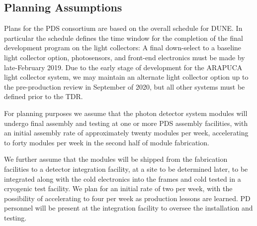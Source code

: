 \subsection{Planning Assumptions}
\label{sec:fdsp-pd-org-assmp}


Plans for the PDS consortium are based on the overall schedule for DUNE. In particular the  schedule defines the time window for the completion of the final development program on the light collectors: A final down-select to a baseline light collector option, photosensors, and front-end electronics must be made by late-February 2019.  Due to the early stage of development for the ARAPUCA light collector system, we may maintain an alternate light collector option up to the pre-production review in September of 2020, but all other systems must be defined prior to the TDR.

For planning purposes we assume that the photon detector system modules will undergo final assembly and testing at one or more PDS assembly facilities, with an initial  assembly rate of approximately twenty modules per week, accelerating to forty modules per week in the second half of module fabrication.

We further assume that the modules will be shipped from the fabrication facilities to a detector integration facility, at a site to be determined later, to be integrated along with the cold electronics into the  frames and cold tested in a cryogenic test facility.  We plan for an initial rate of two  per week, with the possibility of accelerating to four  per week as production lessons are learned.  PD personnel will be present at the integration facility to oversee the installation and testing.

